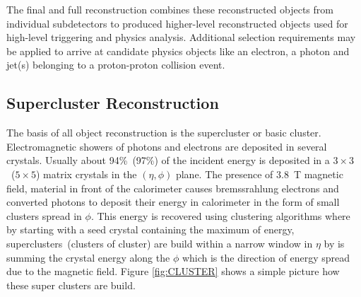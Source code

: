 The final and full reconstruction combines these reconstructed objects from individual subdetectors to produced  higher-level reconstructed objects used for high-level triggering and physics analysis. Additional selection requirements may be applied to arrive at candidate physics objects like an electron, a photon  and jet(s) belonging to a proton-proton collision event.
\subsection{Supercluster Reconstruction}
The basis of all object reconstruction is the supercluster or basic cluster. Electromagnetic showers of photons and electrons are deposited in several crystals. Usually about 94\%~(97\%) of the incident energy is deposited in a $3\times3$~($5\times5$) matrix crystals in the $(\eta, \phi)$ plane. The presence of $3.8$~T magnetic field, material in front of the calorimeter causes bremssrahlung electrons and converted photons to deposit their energy in calorimeter in the form of small clusters spread in $\phi$.  This energy is recovered using clustering algorithms  where by starting with a seed crystal containing the maximum  of energy, superclusters~(clusters of cluster) are build within a narrow window in $\eta$ by is summing  the crystal energy along the $\phi$ which is the direction of energy spread due to the magnetic field. Figure \ref{fig:CLUSTER} shows a simple picture how these super clusters are build.
